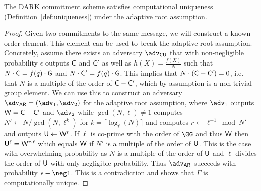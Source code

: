 \begin{lemma} 
The DARK commitment scheme satisfies computational uniqueness (Definition~\ref{def:uniqueness}) under the adaptive root assumption.
\end{lemma}
\begin{proof}

	Given two commitments to the same message, we will construct a known order element. This element can be used to break the adaptive root assumption. Concretely, assume there exists an adversary $\adv_{\mathsf{CU}}$ that with non-negligible probability $\epsilon$ outputs $\gr{C}$ and $\gr{C}'$ as well as $h(X)=\frac{f(X)}{N}$ such that $N \cdot \gr{C}=f(q)\cdot \Generator$ and $N \cdot \gr{C}'=f(q)\cdot \Generator$. This implies that $N\cdot (\gr{C}-\gr{C}')=0$, i.e. that $N$ is a multiple of the order of $\gr{C}-\gr{C}'$, which by assumption is a non trivial group element. We can use this to construct an adversary $\adv_{\mathsf{AR}}=(\adv_1,\adv_2)$ for the adaptive root assumption, where $\adv_1$ outputs $\gr{W}=\gr{C}-\gr{C}'$ and $\adv_2$ while $\gcd(N,\ell)\neq 1$ computes $N'\gets N/\gcd(N,\ell^k)$ for $k=\lceil \log_\ell(N)\rceil$ and computes $r\gets \ell^{-1}\bmod N'$ and outputs $\gr{U}\gets \gr{W}^r$. If $\ell$ is co-prime with the order of $\GG$ and thus $\gr{W}$ then $\gr{U}^\ell=\gr{W}^{r\cdot \ell}$ which equals $\gr{W}$ if $N'$ is a multiple of the order of $\gr{U}$. This is the case with overwhelming probability as $N$ is a multiple of the order of $\gr{U}$ and $\ell$ divides the order of $\gr{U}$ with only negligible probability. Thus $\adv_{\mathsf{AR}}$ succeeds with probability $\epsilon-\negl$.
	This is a contradiction and shows that $\Gamma$ is computationally unique.
		\end{proof}



